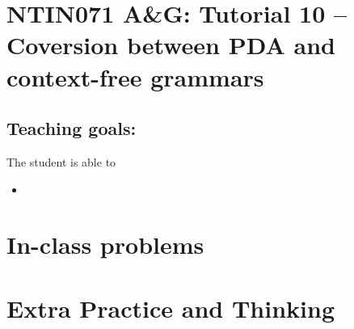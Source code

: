 \documentclass[a4paper,12pt]{amsart}
\begin{document}
\thispagestyle{empty}

\section*{NTIN071 A\&G: Tutorial 10 -- Coversion between PDA and context-free grammars}

\medskip

\subsection*{Teaching goals:} The student is able to

    \begin{itemize}\setlength{\itemsep}{0pt}
        \item 
    \end{itemize}


\section*{In-class problems}


\medskip\begin{problem}

\end{problem}


\section*{Extra Practice and Thinking}


\medskip\begin{problem}

\end{problem}
\end{document}
